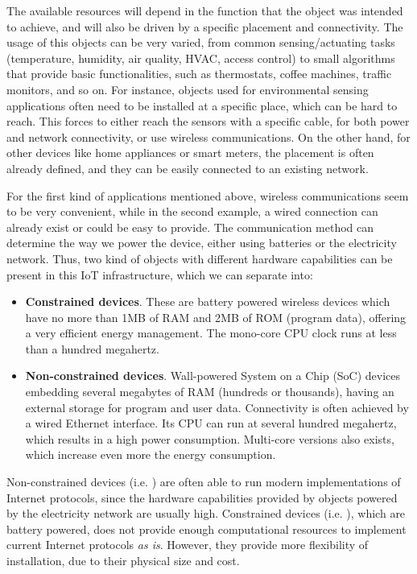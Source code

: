 The available resources will depend in the function that the object was intended to achieve, and will also be driven by a specific placement and connectivity.
The usage of this objects can be very varied, from common sensing/actuating tasks (temperature, humidity, air quality, HVAC, access control) to small algorithms that provide basic functionalities, such as thermostats, coffee machines, traffic monitors, and so on.
For instance, objects used for environmental sensing applications often need to be installed at a specific place\cite{younis2008placement}, which can be hard to reach. 
This forces to either reach the sensors with a specific cable, for both power and network connectivity, or use wireless communications.
On the other hand, for other devices like home appliances or smart meters, the placement is often already defined, and they can be easily connected to an existing network.

For the first kind of applications mentioned above, wireless communications seem to be very convenient, while in the second example, a wired connection can already exist or could be easy to provide.
The communication method can determine the way we power the device, either using batteries or the electricity network.
Thus, two kind of objects with different hardware capabilities can be present in this IoT infrastructure, which we can separate into:

\begin{itemize}
	\item \textbf{Constrained devices}. These are battery powered wireless devices which have no more than 1MB of RAM and 2MB of ROM (program data), offering a very efficient energy management. The mono-core CPU clock runs at less than a hundred megahertz.
	\item \textbf{Non-constrained devices}. Wall-powered System on a Chip (SoC) devices embedding several megabytes of RAM (hundreds or thousands), having an external storage for program and user data. Connectivity is often achieved by a wired Ethernet interface. Its CPU can run at several hundred megahertz, which results in a high power consumption. Multi-core versions also exists, which increase even more the energy consumption.
\end{itemize}

Non-constrained devices (i.e. \cite{RPi}) are often able to run modern implementations of Internet protocols, since the hardware capabilities provided by objects powered by the electricity network are usually high.
Constrained devices (i.e. \cite{iotlab-m3}), which are battery powered, does not provide enough computational resources to implement current Internet protocols \textit{as is}.
However, they provide more flexibility of installation, due to their physical size and cost.

